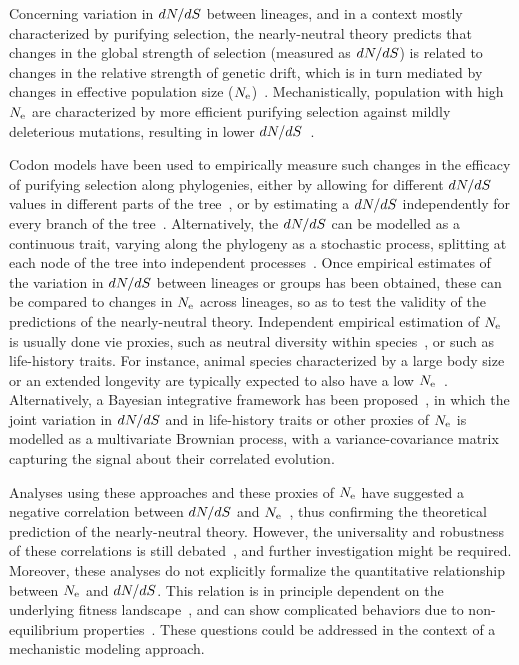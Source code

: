 Concerning variation in $dN/dS$ between lineages, and in a context mostly characterized by purifying selection, the nearly-neutral theory predicts that changes in the global strength of selection (measured as $dN/dS$) is related to changes in the relative strength of genetic drift, which is in turn mediated by changes in effective population size ($N_{\text{e}}$)~\citep{Ohta1992}.
Mechanistically, population with high $N_{\text{e}}$ are characterized by more efficient purifying selection against mildly deleterious mutations, resulting in lower $dN/dS$~\citep{Kimura1979, Welch2008}.

Codon models have been used to empirically measure such changes in the efficacy of purifying selection along phylogenies, either by allowing for different $dN/dS$ values in different parts of the tree~\citep{Dutheil2012}, or by estimating a $dN/dS$ independently for every branch of the tree~\citep{Popadin2007}.
Alternatively, the $dN/dS$ can be modelled as a continuous trait, varying along the phylogeny as a stochastic process, splitting at each node of the tree into independent processes~\citep{Seo2004}.
Once empirical estimates of the variation in $dN/dS$ between lineages or groups has been obtained, these can be compared to changes in $N_{\text{e}}$ across lineages, so as to test the validity of the predictions of the nearly-neutral theory.
Independent empirical estimation of $N_{\text{e}}$ is usually done vie proxies, such as neutral diversity within species~\citep{Galtier2016}, or such as life-history traits.
For instance, animal species characterized by a large body size or an extended longevity are typically expected to also have a low $N_{\text{e}}$~\citep{Romiguier2014}.
Alternatively, a Bayesian integrative framework has been proposed~\citep{Lartillot2011}, in which the joint variation in $dN/dS$ and in life-history traits or other proxies of $N_{\text{e}}$ is modelled as a multivariate Brownian process, with a variance-covariance matrix capturing the signal about their correlated evolution.

Analyses using these approaches and these proxies of $N_{\text{e}}$ have suggested a negative correlation between $dN/dS$ and $N_{\text{e}}$~\citep{Popadin2007, Lanfear2010, Lartillot2011, Lartillot2012, Romiguier2014, Figuet2017}, thus confirming the theoretical prediction of the nearly-neutral theory.
However, the universality and robustness of these correlations is still debated~\citep{Nabholz2013,Lanfear2014,Figuet2016, Bolivar2019}, and further investigation might be required.
Moreover, these analyses do not explicitly formalize the quantitative relationship between $N_{\text{e}}$ and $dN/dS$.
This relation is in principle dependent on the underlying fitness landscape~\citep{Welch2008}, and can show complicated behaviors due to non-equilibrium properties~\citep{Jones2016}.
These questions could be addressed in the context of a mechanistic modeling approach.

